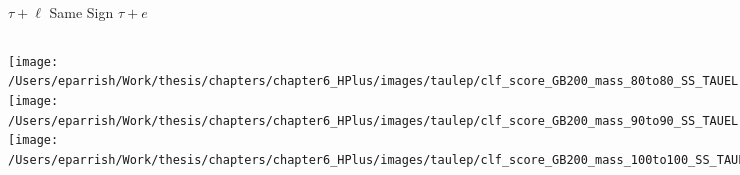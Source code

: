 \documentclass[aspectratio=169,xcolor=table]{beamer}
\begin{document}
    \begin{frame}[t]{$\tau+\ell$ Same Sign $\tau+e$}
      \begin{columns}[t]
          \texttt{[image: /Users/eparrish/Work/thesis/chapters/chapter6\_HPlus/images/taulep/clf\_score\_GB200\_mass\_80to80\_SS\_TAUEL.png]}
          \texttt{[image: /Users/eparrish/Work/thesis/chapters/chapter6\_HPlus/images/taulep/clf\_score\_GB200\_mass\_90to90\_SS\_TAUEL.png]}
          \texttt{[image: /Users/eparrish/Work/thesis/chapters/chapter6\_HPlus/images/taulep/clf\_score\_GB200\_mass\_100to100\_SS\_TAUEL.png]}

          \texttt{[image: /Users/eparrish/Work/thesis/chapters/chapter6\_HPlus/images/taulep/clf\_score\_GB200\_mass\_110to110\_SS\_TAUEL.png]}
          \texttt{[image: /Users/eparrish/Work/thesis/chapters/chapter6\_HPlus/images/taulep/clf\_score\_GB200\_mass\_120to120\_SS\_TAUEL.png]}
          \texttt{[image: /Users/eparrish/Work/thesis/chapters/chapter6\_HPlus/images/taulep/clf\_score\_GB200\_mass\_130to130\_SS\_TAUEL.png]}
          \texttt{[image: /Users/eparrish/Work/thesis/chapters/chapter6\_HPlus/images/taulep/clf\_score\_GB200\_mass\_140to140\_SS\_TAUEL.png]}
          \texttt{[image: /Users/eparrish/Work/thesis/chapters/chapter6\_HPlus/images/taulep/clf\_score\_GB200\_mass\_150to150\_SS\_TAUEL.png]}
          \texttt{[image: /Users/eparrish/Work/thesis/chapters/chapter6\_HPlus/images/taulep/clf\_score\_GB200\_mass\_160to160\_SS\_TAUEL.png]}

          \texttt{[image: /Users/eparrish/Work/thesis/chapters/chapter6\_HPlus/images/taulep/clf\_score\_GB200\_mass\_170to170\_SS\_TAUEL.png]}
          \texttt{[image: /Users/eparrish/Work/thesis/chapters/chapter6\_HPlus/images/taulep/clf\_score\_GB200\_mass\_180to180\_SS\_TAUEL.png]}
          \texttt{[image: /Users/eparrish/Work/thesis/chapters/chapter6\_HPlus/images/taulep/clf\_score\_GB200\_mass\_190to190\_SS\_TAUEL.png]}

      \end{columns}
    \end{frame}
\end{document}
